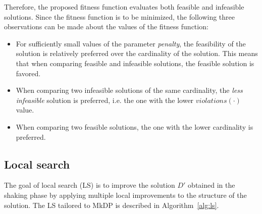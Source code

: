 \documentclass[dvipsnames,format=sigconf,anonymous=true,review=true]{acmart}
\begin{document}
Therefore, the proposed fitness function evaluates both feasible and infeasible solutions. Since the fitness function is to be minimized, the following three observations can be made about the values of the fitness function:
\begin{itemize}
 		\item For sufficiently small values of the parameter \emph{penalty}, the feasibility of the solution is relatively preferred over the cardinality of the solution. This means that when comparing feasible and infeasible solutions, the feasible solution is favored. 
 
     	\item When comparing two infeasible solutions of the same cardinality, the \emph{less infeasible} solution is preferred, i.e. the one with the lower $violations(\cdot)$ value.  
        
        \item When comparing two feasible solutions, the one with the lower cardinality is preferred.
\end{itemize}

\subsection{Local search}\label{sec:local_search}
The goal of local search (LS) is to improve the solution $D'$ obtained in the shaking phase by applying multiple local improvements to the structure of the solution. 
The LS tailored to MkDP is described in Algorithm~\ref{alg:ls}.
\end{document}

